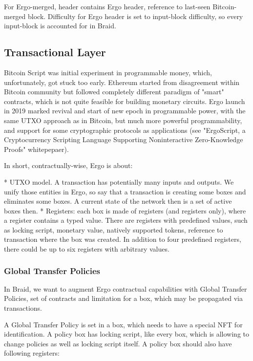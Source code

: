 \documentclass{llncs}   %
\begin{document}
For Ergo-merged, header contains Ergo header, reference to last-seen Bitcoin-merged block. Difficulty for Ergo header is set to input-block difficulty, so every input-block is accounted for in Braid. 


\subsection{Transactional Layer}

Bitcoin Script was initial experiment in programmable money, which, unfortunately, got stuck too early. Ethereum started from disagreement
within Bitcoin community but followed completely different paradigm of "smart" contracts, which is not quite feasible for building monetary circuits. Ergo launch in 2019 marked revival and start of new epoch in programmable power, with the same UTXO approach as in Bitcoin, but much more powerful programmability, and support for some cryptographic protocols as applications (see "ErgoScript, a Cryptocurrency Scripting Language Supporting Noninteractive Zero-Knowledge Proofs" whitepepaer).

In short, contractually-wise, Ergo is about:

* UTXO model. A transaction has potentially many inputs and outputs. We unify those entities in Ergo, so say that a transaction is creating some boxes and eliminates some boxes. A current state of the network then is a set of active boxes then. 
* Registers: each box is made of registers (and registers only), where a register contains a typed value. There are registers with predefined values, such as locking script, monetary value, natively supported tokens, reference to transaction where the box was created. In addition to four predefined registers, there could be up to six registers with arbitrary values.


\subsubsection{Global Transfer Policies}

In Braid, we want to augment Ergo contractual capabilities with Global Transfer Policies, set of contracts and limitation for a box, which may be propagated via transactions.

A Global Transfer Policy is set in a box, which needs to have a special NFT for identification. A policy box has locking script, like every box, which is allowing to change policies as well as locking script itself. A policy box should also have following registers:
\end{document}
